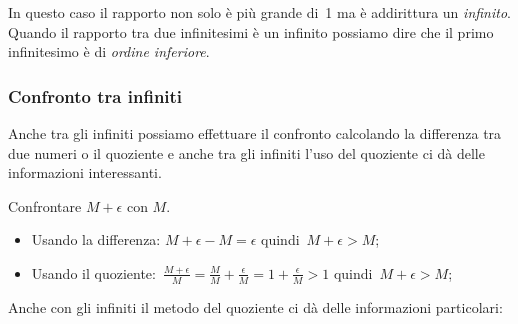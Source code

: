 \begin{enumerate}
  \begin{osservazione}
   In questo caso il rapporto non solo è più grande di~1 ma è addirittura un 
   \emph{infinito}. 
   Quando il rapporto tra due infinitesimi è un infinito 
   possiamo dire che il primo infinitesimo è di \emph{ordine inferiore}.
  \end{osservazione}
 \end{enumerate}

\subsubsection{Confronto tra infiniti}
\label{subsubsec:insnum_confrontoreali}

Anche tra gli infiniti possiamo effettuare il confronto calcolando la 
differenza tra due numeri o il quoziente e anche tra gli infiniti l'uso del 
quoziente ci dà delle informazioni interessanti.

\begin{esempio}
Confrontare $M+\epsilon$ con $M$.
\begin{itemize} [noitemsep]
 \item Usando la differenza: $M+\epsilon - M = \epsilon$ 
quindi~$M+\epsilon > M$;
 \item Usando il quoziente:~$\frac{M+\epsilon}{M}= 
\frac{M}{M}+\frac{\epsilon}{M}= 1 + \frac{\epsilon}{M} > 1$
quindi~$M+\epsilon > M$;
\end{itemize}
\end{esempio}

\noindent Anche con gli infiniti il metodo del quoziente ci dà delle 
informazioni 
particolari:


